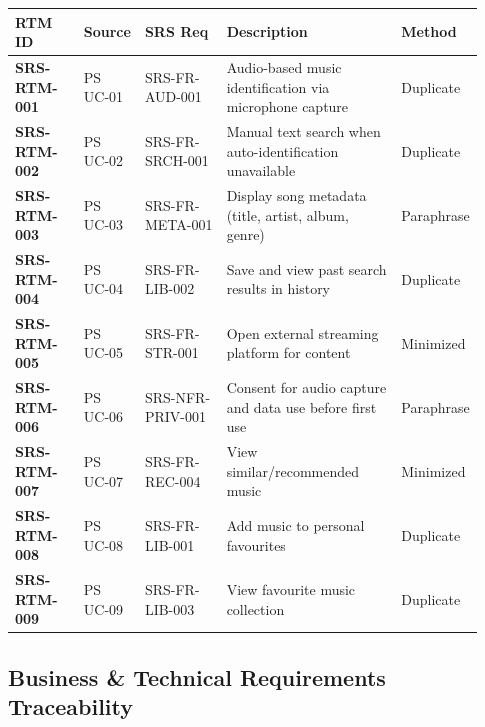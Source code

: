 \documentclass[12pt, a4paper]{article}
\begin{document}
\begin{longtable}[]{@{}
  >{\raggedright\arraybackslash}p{0.15\linewidth}
  >{\raggedright\arraybackslash}p{0.12\linewidth}
  >{\raggedright\arraybackslash}p{0.18\linewidth}
  >{\raggedright\arraybackslash}p{0.38\linewidth}
  >{\raggedright\arraybackslash}p{0.10\linewidth}@{}}
\toprule
\textbf{RTM ID} & \textbf{Source} & \textbf{SRS Req} &
\textbf{Description} & \textbf{Method} \\
\midrule
\endhead
\bottomrule
\endlastfoot
\textbf{SRS-RTM-001} & PS UC-01 & SRS-FR-AUD-001 & Audio-based music identification via microphone capture & Duplicate \\
\textbf{SRS-RTM-002} & PS UC-02 & SRS-FR-SRCH-001 & Manual text search when auto-identification unavailable & Duplicate \\
\textbf{SRS-RTM-003} & PS UC-03 & SRS-FR-META-001 & Display song metadata (title, artist, album, genre) & Paraphrase \\
\textbf{SRS-RTM-004} & PS UC-04 & SRS-FR-LIB-002 & Save and view past search results in history & Duplicate \\
\textbf{SRS-RTM-005} & PS UC-05 & SRS-FR-STR-001 & Open external streaming platform for content & Minimized \\
\textbf{SRS-RTM-006} & PS UC-06 & SRS-NFR-PRIV-001 & Consent for audio capture and data use before first use & Paraphrase \\
\textbf{SRS-RTM-007} & PS UC-07 & SRS-FR-REC-004 & View similar/recommended music & Minimized \\
\textbf{SRS-RTM-008} & PS UC-08 & SRS-FR-LIB-001 & Add music to personal favourites & Duplicate \\
\textbf{SRS-RTM-009} & PS UC-09 & SRS-FR-LIB-003 & View favourite music collection & Duplicate \\
\end{longtable}

\subsection*{Business \& Technical Requirements Traceability}
\end{document}
